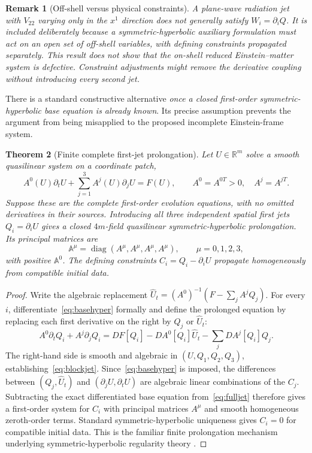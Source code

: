 \documentclass[11pt,a4paper]{article}
\newtheorem{theorem}{Theorem}[section]
\newtheorem{remark}[theorem]{Remark}
\begin{document}
\begin{remark}[Off-shell versus physical constraints]
A plane-wave radiation jet with $V_{22}$ varying only in the $x^1$ direction does not generally satisfy $W_i=\partial_iQ$. It is included deliberately because a symmetric-hyperbolic auxiliary formulation must act on an open set of off-shell variables, with defining constraints propagated separately. This result does not show that the on-shell reduced Einstein--matter system is defective. Constraint adjustments might remove the derivative coupling without introducing every second jet.
\end{remark}

There is a standard constructive alternative \emph{once a closed first-order symmetric-hyperbolic base equation is already known}. Its precise assumption prevents the argument from being misapplied to the proposed incomplete Einstein-frame system.

\begin{theorem}[Finite complete first-jet prolongation]\label{thm:firstjet}
Let $U\in\mathbb R^m$ solve a smooth quasilinear system on a coordinate patch,
\begin{equation}\label{eq:basehyper}
A^0(U)\partial_tU+\sum_{j=1}^3A^j(U)\partial_jU=F(U),
\qquad A^0=A^{0T}>0,\quad A^j=A^{jT}.
\end{equation}
Suppose these are the \emph{complete} first-order evolution equations, with no omitted derivatives in their sources. Introducing all three independent spatial first jets $Q_i=\partial_iU$ gives a closed $4m$-field quasilinear symmetric-hyperbolic prolongation. Its principal matrices are
\begin{equation}\label{eq:blockjet}
\mathbb A^\mu=\operatorname{diag}(A^\mu,A^\mu,A^\mu,A^\mu),\qquad \mu=0,1,2,3,
\end{equation}
with positive $\mathbb A^0$. The defining constraints $C_i=Q_i-\partial_iU$ propagate homogeneously from compatible initial data.
\end{theorem}
\begin{proof}
Write the algebraic replacement
$\widehat U_t=(A^0)^{-1}(F-\sum_jA^jQ_j)$.
For every $i$, differentiate~\eqref{eq:basehyper} formally and define the prolonged equation by replacing each first derivative on the right by $Q_j$ or $\widehat U_t$:
\begin{equation}\label{eq:fulljet}
A^0\partial_tQ_i+A^j\partial_jQ_i
=DF[Q_i]-DA^0[Q_i]\widehat U_t
-\sum_j DA^j[Q_i]Q_j.
\end{equation}
The right-hand side is smooth and algebraic in $(U,Q_1,Q_2,Q_3)$, establishing~\eqref{eq:blockjet}. Since~\eqref{eq:basehyper} is imposed, the differences between $(Q_j,\widehat U_t)$ and $(\partial_jU,\partial_tU)$ are algebraic linear combinations of the $C_j$. Subtracting the exact differentiated base equation from~\eqref{eq:fulljet} therefore gives a first-order system for $C_i$ with principal matrices $A^\mu$ and smooth homogeneous zeroth-order terms. Standard symmetric-hyperbolic uniqueness gives $C_i=0$ for compatible initial data. This is the familiar finite prolongation mechanism underlying symmetric-hyperbolic regularity theory \cite{Kato}.
\end{proof}
\end{document}
